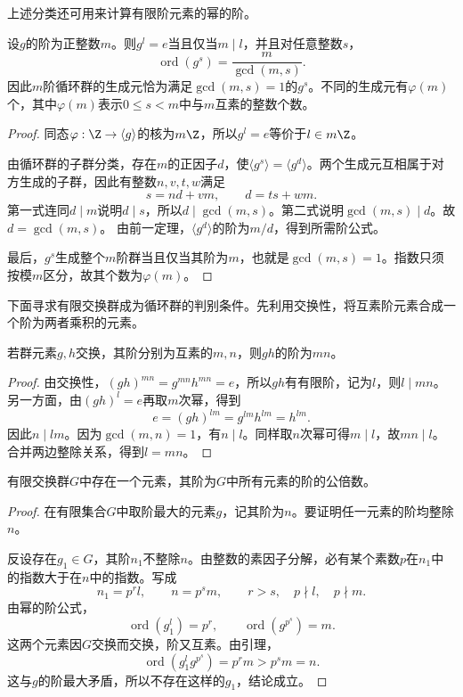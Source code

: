 上述分类还可用来计算有限阶元素的幂的阶。

\begin{proposition}
设$g$的阶为正整数$m$。则$g^l=e$当且仅当$m\mid l$，并且对任意整数$s$，
\[
\operatorname{ord}(g^s)=\frac{m}{\gcd(m,s)}.
\]
因此$m$阶循环群的生成元恰为满足$\gcd(m,s)=1$的$g^s$。不同的生成元有$\varphi(m)$个，其中$\varphi(m)$表示$0\leq s<m$中与$m$互素的整数个数。
\end{proposition}
\begin{proof}
同态$\varphi:\Z\to\langle g\rangle$的核为$m\Z$，所以$g^l=e$等价于$l\in m\Z$。

由循环群的子群分类，存在$m$的正因子$d$，使$\langle g^s\rangle=\langle g^d\rangle$。两个生成元互相属于对方生成的子群，因此有整数$n,v,t,w$满足
\[
s=nd+vm,\qquad d=ts+wm.
\]
第一式连同$d\mid m$说明$d\mid s$，所以$d\mid\gcd(m,s)$。第二式说明$\gcd(m,s)\mid d$。故$d=\gcd(m,s)$。
由前一定理，$\langle g^d\rangle$的阶为$m/d$，得到所需阶公式。

最后，$g^s$生成整个$m$阶群当且仅当其阶为$m$，也就是$\gcd(m,s)=1$。指数只须按模$m$区分，故其个数为$\varphi(m)$。
\end{proof}

下面寻求有限交换群成为循环群的判别条件。先利用交换性，将互素阶元素合成一个阶为两者乘积的元素。

\begin{lemma}
若群元素$g,h$交换，其阶分别为互素的$m,n$，则$gh$的阶为$mn$。
\end{lemma}
\begin{proof}
由交换性，$(gh)^{mn}=g^{mn}h^{mn}=e$，所以$gh$有有限阶，记为$l$，则$l\mid mn$。
另一方面，由$(gh)^l=e$再取$m$次幂，得到
\[
e=(gh)^{lm}=g^{lm}h^{lm}=h^{lm}.
\]
因此$n\mid lm$。因为$\gcd(m,n)=1$，有$n\mid l$。同样取$n$次幂可得$m\mid l$，故$mn\mid l$。合并两边整除关系，得到$l=mn$。
\end{proof}

\begin{theorem}\label{p2:max-order}
有限交换群$G$中存在一个元素，其阶为$G$中所有元素的阶的公倍数。
\end{theorem}
\begin{proof}
在有限集合$G$中取阶最大的元素$g$，记其阶为$n$。要证明任一元素的阶均整除$n$。

反设存在$g_1\in G$，其阶$n_1$不整除$n$。由整数的素因子分解，必有某个素数$p$在$n_1$中的指数大于在$n$中的指数。写成
\[
n_1=p^rl,\qquad n=p^sm,\qquad r>s,\quad p\nmid l,\quad p\nmid m.
\]
由幂的阶公式，
\[
\operatorname{ord}(g_1^l)=p^r,\qquad
\operatorname{ord}(g^{p^s})=m.
\]
这两个元素因$G$交换而交换，阶又互素。由引理，
\[
\operatorname{ord}(g_1^l g^{p^s})=p^rm>p^sm=n.
\]
这与$g$的阶最大矛盾，所以不存在这样的$g_1$，结论成立。
\end{proof}

